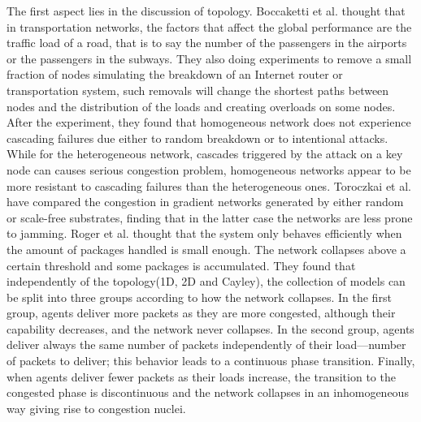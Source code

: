 \documentclass[onecolumn,preprintnumbers,amsmath,amssymb]{revtex4}
\begin{document}
The first aspect lies in the discussion of topology.
Boccaketti et al. thought that in transportation networks, the factors that affect the global performance are the traffic load of a road, that is to say the number of the passengers in the airports or the passengers in the subways. They also doing experiments to remove a small fraction of nodes simulating the breakdown of an Internet router or transportation system, such removals will change the shortest paths between nodes and the distribution of the loads and creating overloads on some nodes. After the experiment, they found that homogeneous network does not experience cascading failures due either to random breakdown or to intentional attacks. While for the heterogeneous network, cascades triggered by the attack on a key node can causes serious congestion problem, homogeneous networks appear to be more resistant to cascading failures than the heterogeneous ones\cite{SBVV}.
Toroczkai et al. have compared the congestion in gradient networks generated by either random or scale-free substrates, finding that in the latter case the networks are less prone to jamming\cite{ZTKE,ZTBE}.
Roger et al. thought that the system only behaves efficiently when the amount of packages handled is small enough. The network collapses above a certain threshold and some packages is accumulated. They found that independently of the topology(1D, 2D and Cayley), the collection of models can be split into three groups according to how the network collapses. In the first group, agents deliver more packets as they are more congested, although their capability decreases, and the network never collapses. In the second group, agents deliver always the same number of packets independently of their load—number of packets to deliver; this behavior leads to a continuous phase transition. Finally, when agents deliver fewer packets as their loads increase, the transition to the congested phase is discontinuous and the network collapses in an inhomogeneous way giving rise to congestion nuclei\cite{RGA}.
\end{document}
